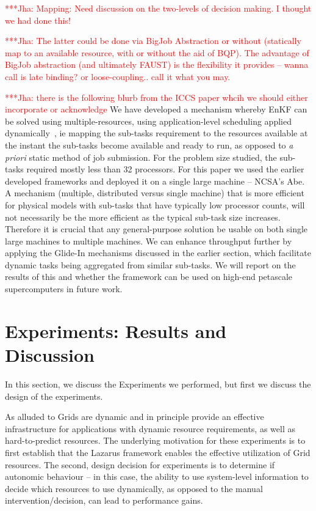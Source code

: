 \documentclass[conference,final]{IEEEtran}
\newcommand{\jhanote}[1]{ {\textcolor{red} { ***Jha: #1 }}}
\newcommand{\jhanote}[1]{}
\begin{document}
\jhanote{Mapping: Need discussion on the two-levels of decision
  making. I thought we had done this!}

\jhanote{The latter could be done via BigJob Abstraction or without
  (statically map to an available resource, with or without the aid of
  BQP).  The advantage of BigJob abstraction (and ultimately FAUST) is
  the flexibility it provides -- wanna call is late binding? or
  loose-coupling..  call it what you may.}

\jhanote{there is the following blurb from the ICCS paper whcih we
  should either incorporate or acknowledge} We have developed a
mechanism whereby EnKF can be solved using multiple-resources, using
application-level scheduling applied dynamically~\cite{saga_tg08}, ie
mapping the sub-tasks requirement to the resources available at the
instant the sub-tasks become available and ready to run, as opposed to
{\it a priori} static method of job submission.  For the problem size
studied, the sub-tasks required mostly less than 32 processors. For
this paper we used the earlier developed frameworks and deployed it on
a single large machine -- NCSA's Abe. A mechanism (multiple,
distributed versus single machine) that is more efficient for physical
models with sub-tasks that have typically low processor counts, will
not necessarily be the more efficient as the typical sub-task size
increases. Therefore it is crucial that any general-purpose solution
be usable on both single large machines to multiple machines.  We can
enhance throughput further by applying the Glide-In mechanisms
discussed in the earlier section, which facilitate dynamic tasks being
aggregated from similar sub-tasks. We will report on the results of
this and whether the framework can be used on high-end petascale
supercomputers in future work.


\section{Experiments: Results and Discussion}

In this section, we discuss the Experiments we performed, but first
we discuss the design of the experiments.

As alluded to Grids are dynamic and in principle provide an effective
infrastructure for applications with dynamic resource requirements, as
well as hard-to-predict resources. The underlying motivation for these
experiments is to first establish that the Lazarus framework enables
the effective utilization of Grid resources. The second, design
decision for experiments is to determine if autonomic behaviour -- in
this case, the ability to use system-level information to decide which
resources to use dynamically, as opposed to the manual
intervention/decision, can lead to performance gains.
\end{document}

